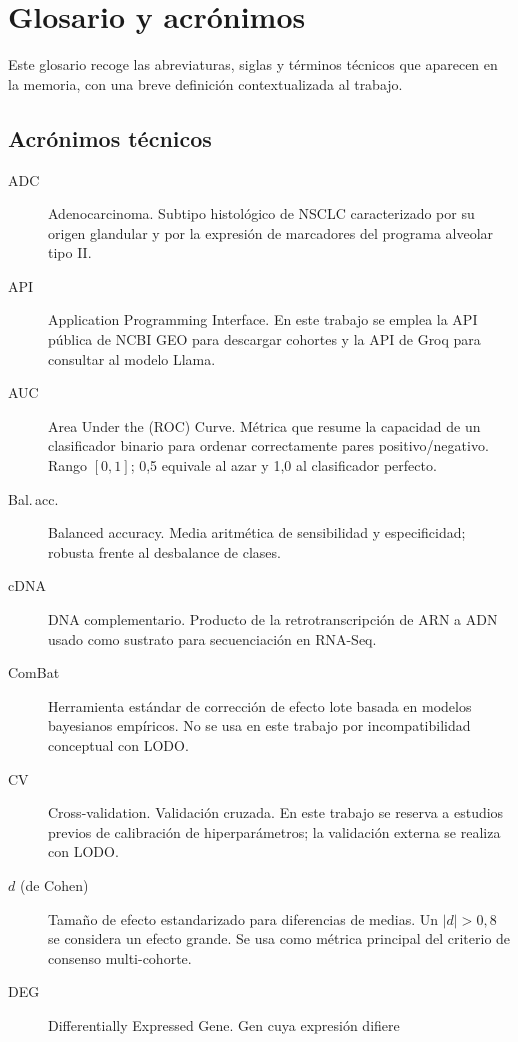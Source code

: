 \chapter{Glosario y acrónimos}
\label{anexo:glosario}

Este glosario recoge las abreviaturas, siglas y términos técnicos que
aparecen en la memoria, con una breve definición contextualizada al
trabajo.

\section*{Acrónimos técnicos}
{}

\begin{description}
  \item[ADC] Adenocarcinoma. Subtipo histológico de NSCLC caracterizado
  por su origen glandular y por la expresión de marcadores del programa
  alveolar tipo II.
  \item[API] Application Programming Interface. En este trabajo se
  emplea la API pública de NCBI GEO para descargar cohortes y la API de
  Groq para consultar al modelo Llama.
  \item[AUC] Area Under the (ROC) Curve. Métrica que resume la
  capacidad de un clasificador binario para ordenar correctamente pares
  positivo/negativo. Rango $[0,1]$; 0,5 equivale al azar y 1,0 al
  clasificador perfecto.
  \item[Bal.\,acc.] Balanced accuracy. Media aritmética de sensibilidad
  y especificidad; robusta frente al desbalance de clases.
  \item[cDNA] DNA complementario. Producto de la retrotranscripción de
  ARN a ADN usado como sustrato para secuenciación en RNA-Seq.
  \item[ComBat] Herramienta estándar de corrección de efecto lote basada
  en modelos bayesianos empíricos. No se usa en este trabajo por
  incompatibilidad conceptual con LODO.
  \item[CV] Cross-validation. Validación cruzada. En este trabajo se
  reserva a estudios previos de calibración de hiperparámetros; la
  validación externa se realiza con LODO.
  \item[$d$ (de Cohen)] Tamaño de efecto estandarizado para diferencias
  de medias. Un $|d|>0{,}8$ se considera un efecto grande. Se usa como
  métrica principal del criterio de consenso multi-cohorte.
  \item[DEG] Differentially Expressed Gene. Gen cuya expresión difiere

\end{description}
